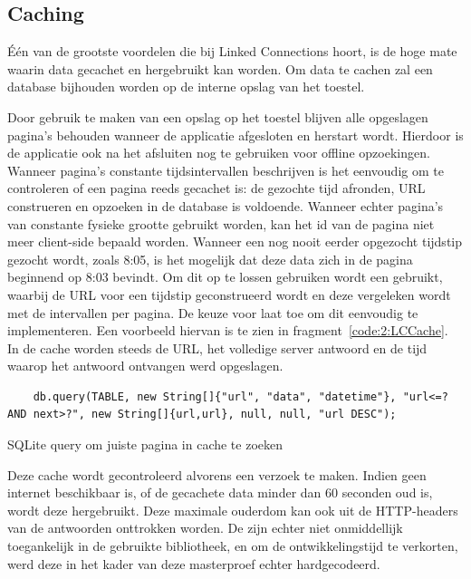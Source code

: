 \subsection{Caching}
Één van de grootste voordelen die bij Linked Connections hoort, is de hoge mate waarin data gecachet en hergebruikt kan worden. Om data te cachen zal een  database bijhouden worden op de interne opslag van het toestel.

Door gebruik te maken van een opslag op het toestel blijven alle opgeslagen pagina's behouden wanneer de applicatie afgesloten en herstart wordt. Hierdoor is de applicatie ook na het afsluiten nog te gebruiken voor offline opzoekingen. Wanneer pagina's constante tijdsintervallen beschrijven is het eenvoudig om te controleren of een pagina reeds gecachet is: de gezochte tijd afronden, URL construeren en opzoeken in de database is voldoende. Wanneer echter pagina's van constante fysieke grootte gebruikt worden, kan het id van de pagina niet meer client-side bepaald worden. Wanneer een nog nooit eerder opgezocht tijdstip gezocht wordt, zoals 8:05, is het mogelijk dat deze data zich in de pagina beginnend op 8:03 bevindt. Om dit op te lossen gebruiken wordt een  gebruikt, waarbij de URL voor een tijdstip geconstrueerd wordt en deze vergeleken wordt met de intervallen per pagina. De keuze voor  laat toe om dit eenvoudig te implementeren. Een voorbeeld hiervan is te zien in fragment~\ref{code:2:LCCache}. In de cache worden steeds de URL, het volledige server antwoord en de tijd waarop het antwoord ontvangen werd opgeslagen.

\begin{listing}[h]
	\begin{verbatim}
    db.query(TABLE, new String[]{"url", "data", "datetime"}, "url<=? AND next>?", new String[]{url,url}, null, null, "url DESC");
	\end{verbatim}
	\caption[Zoeken van pagina's in offline cache]{SQLite query om juiste pagina in cache te zoeken}
	\label{code:2:LCCache}
\end{listing}

Deze cache wordt gecontroleerd alvorens een verzoek te maken. Indien geen internet beschikbaar is, of de gecachete data minder dan 60 seconden oud is, wordt deze hergebruikt. Deze maximale ouderdom kan ook uit de HTTP-headers van de antwoorden onttrokken worden. De  zijn echter niet onmiddellijk toegankelijk in de gebruikte bibliotheek, en om de ontwikkelingstijd te verkorten, werd deze in het kader van deze masterproef echter hardgecodeerd.

